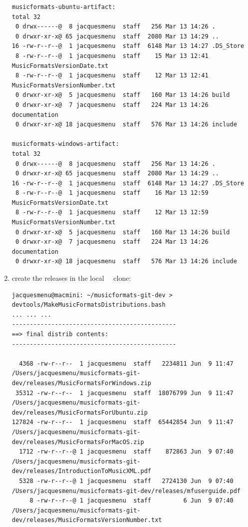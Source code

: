 \begin{enumerate}
\begin{lstlisting}[language=Terminal]
musicformats-ubuntu-artifact:
total 32
 0 drwx------@  8 jacquesmenu  staff   256 Mar 13 14:26 .
 0 drwxr-xr-x@ 65 jacquesmenu  staff  2080 Mar 13 14:29 ..
16 -rw-r--r--@  1 jacquesmenu  staff  6148 Mar 13 14:27 .DS_Store
 8 -rw-r--r--@  1 jacquesmenu  staff    15 Mar 13 12:41 MusicFormatsVersionDate.txt
 8 -rw-r--r--@  1 jacquesmenu  staff    12 Mar 13 12:41 MusicFormatsVersionNumber.txt
 0 drwxr-xr-x@  5 jacquesmenu  staff   160 Mar 13 14:26 build
 0 drwxr-xr-x@  7 jacquesmenu  staff   224 Mar 13 14:26 documentation
 0 drwxr-xr-x@ 18 jacquesmenu  staff   576 Mar 13 14:26 include

musicformats-windows-artifact:
total 32
 0 drwx------@  8 jacquesmenu  staff   256 Mar 13 14:26 .
 0 drwxr-xr-x@ 65 jacquesmenu  staff  2080 Mar 13 14:29 ..
16 -rw-r--r--@  1 jacquesmenu  staff  6148 Mar 13 14:27 .DS_Store
 8 -rw-r--r--@  1 jacquesmenu  staff    16 Mar 13 12:59 MusicFormatsVersionDate.txt
 8 -rw-r--r--@  1 jacquesmenu  staff    12 Mar 13 12:59 MusicFormatsVersionNumber.txt
 0 drwxr-xr-x@  5 jacquesmenu  staff   160 Mar 13 14:26 build
 0 drwxr-xr-x@  7 jacquesmenu  staff   224 Mar 13 14:26 documentation
 0 drwxr-xr-x@ 18 jacquesmenu  staff   576 Mar 13 14:26 include
\end{lstlisting}


\item create the releases in the local \mf\ \repo\ clone:
\begin{lstlisting}[language=TerminalSmall]
jacquesmenu@macmini: ~/musicformats-git-dev > devtools/MakeMusicFormatsDistributions.bash
... ... ...
----------------------------------------------
==> final distrib contents:
----------------------------------------------

  4368 -rw-r--r--  1 jacquesmenu  staff   2234811 Jun  9 11:47 /Users/jacquesmenu/musicformats-git-dev/releases/MusicFormatsForWindows.zip
 35312 -rw-r--r--  1 jacquesmenu  staff  18076799 Jun  9 11:47 /Users/jacquesmenu/musicformats-git-dev/releases/MusicFormatsForUbuntu.zip
127824 -rw-r--r--  1 jacquesmenu  staff  65442854 Jun  9 11:47 /Users/jacquesmenu/musicformats-git-dev/releases/MusicFormatsForMacOS.zip
  1712 -rw-r--r--@ 1 jacquesmenu  staff    872863 Jun  9 07:40 /Users/jacquesmenu/musicformats-git-dev/releases/IntroductionToMusicXML.pdf
  5328 -rw-r--r--@ 1 jacquesmenu  staff   2724130 Jun  9 07:40 /Users/jacquesmenu/musicformats-git-dev/releases/mfuserguide.pdf
     8 -rw-r--r--@ 1 jacquesmenu  staff         6 Jun  9 07:40 /Users/jacquesmenu/musicformats-git-dev/releases/MusicFormatsVersionNumber.txt


\end{lstlisting}
\end{enumerate}
